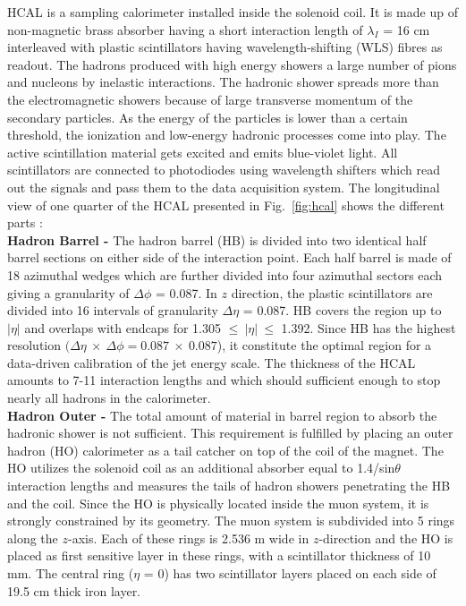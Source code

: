 HCAL is a sampling calorimeter installed inside the solenoid coil. It is made up of non-magnetic brass absorber having a short interaction length of $\lambda_I$ = 16 cm interleaved with plastic scintillators having wavelength-shifting (WLS) fibres as readout. The hadrons produced with high energy showers a large number of pions and nucleons by inelastic interactions. The hadronic shower spreads more than the electromagnetic showers because of large transverse momentum of the secondary particles. As the energy of the particles is lower than a certain threshold, the ionization and low-energy hadronic processes come into play. The active scintillation material gets excited and emits blue-violet light. All scintillators are connected to photodiodes using wavelength shifters which read out the signals and pass them to the data acquisition system. The longitudinal view of one quarter of the HCAL presented in Fig.~\ref{fig:hcal} shows the different parts : \\\newline
{\bf Hadron Barrel -} The hadron barrel (HB) is divided into two identical half barrel sections on either side of the interaction point. Each half barrel is made of 18 azimuthal wedges which are further divided into four azimuthal sectors each giving a granularity of $\Delta\phi$ = 0.087. In $z$ direction, the plastic scintillators are divided into 16 intervals of granularity $\Delta\eta$ = 0.087. HB covers the region up to $|\eta|$  and overlaps with endcaps for 1.305 $\leq~|\eta|~\leq$ 1.392. Since HB has the highest resolution $(\Delta\eta~\times~\Delta\phi = 0.087~\times~0.087$), it constitute the optimal region for a data-driven calibration of the jet energy scale. The thickness of the HCAL amounts to 7-11 interaction lengths and which should sufficient enough to stop nearly all hadrons in the calorimeter.\\\newline
{\bf Hadron Outer -} The total amount of material in barrel region to absorb the hadronic shower is not sufficient. This requirement is fulfilled by placing an outer hadron (HO) calorimeter as a tail catcher on top of the coil of the magnet. The HO utilizes the solenoid coil as an additional absorber equal to 1.4/sin$\theta$ interaction lengths and measures the tails of hadron showers penetrating the HB and the coil. Since the HO is physically located inside the muon system, it is strongly constrained by its geometry. The muon system is subdivided into 5 rings along the $z$-axis. Each of these rings is 2.536 m wide in $z$-direction and the HO is placed as first sensitive layer in these rings, with a scintillator thickness of 10 mm. The central ring ($\eta$ = 0) has two scintillator layers placed on each side of 19.5 cm thick iron layer.\\ \newline
